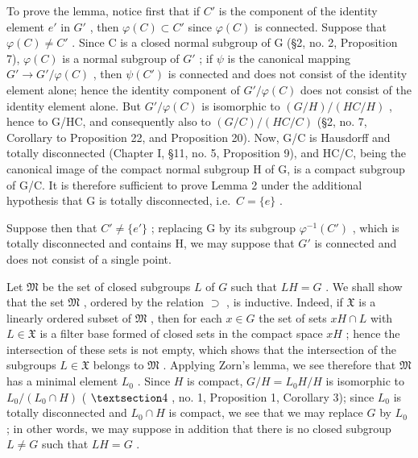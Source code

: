 To prove the lemma, notice first that if \(C'\) is the component of the identity element \(e'\) in \(G'\) , then \(\varphi(C) \subset C'\) since \(\varphi(C)\) is connected. Suppose that \(\varphi(C) \neq C'\) . Since C is a closed normal subgroup of G (§2, no. 2, Proposition 7), \(\varphi(C)\) is a normal subgroup of \(G'\) ; if \(\psi\) is the canonical mapping \(G' \to G'/\varphi(C)\) , then \(\psi(C')\) is connected and does not consist of the identity element alone; hence the identity component of \(G'/\varphi(C)\) does not consist of the identity element alone. But \(G'/\varphi(C)\) is isomorphic to \((G/H)/(HC/H)\) , hence to G/HC, and consequently also to \((G/C)/(HC/C)\) (§2, no. 7, Corollary to Proposition 22, and Proposition 20). Now, G/C is Hausdorff and totally disconnected (Chapter I, §11, no. 5, Proposition 9), and HC/C, being the canonical image of the compact normal subgroup H of G, is a compact subgroup of G/C. It is therefore sufficient to prove Lemma 2 under the additional hypothesis that G is totally disconnected, i.e.~\(C = \{e\}\) .

Suppose then that \(C' \neq \{e'\}\) ; replacing G by its subgroup \(\varphi^{-1}(C')\) , which is totally disconnected and contains H, we may suppose that \(G'\) is connected and does not consist of a single point.

Let \(\mathfrak{M}\) be the set of closed subgroups \(L\) of \(G\) such that \(LH = G\) . We shall show that the set \(\mathfrak{M}\) , ordered by the relation \(\supset\) , is inductive. Indeed, if \(\mathfrak{X}\) is a linearly ordered subset of \(\mathfrak{M}\) , then for each \(x \in G\) the set of sets \(xH \cap L\) with \(L \in \mathfrak{X}\) is a filter base formed of closed sets in the compact space \(xH\) ; hence the intersection of these sets is not empty, which shows that the intersection of the subgroups \(L \in \mathfrak{X}\) belongs to \(\mathfrak{M}\) . Applying Zorn's lemma, we see therefore that \(\mathfrak{M}\) has a minimal element \(L_0\) . Since \(H\) is compact, \(G/H = L_0H/H\) is isomorphic to \(L_0/(L_0 \cap H)\) ( \(\S 4\) , no. 1, Proposition 1, Corollary 3); since \(L_0\) is totally disconnected and \(L_0 \cap H\) is compact, we see that we may replace \(G\) by \(L_0\) ; in other words, we may suppose in addition that there is no closed subgroup \(L \neq G\) such that \(LH = G\) .

